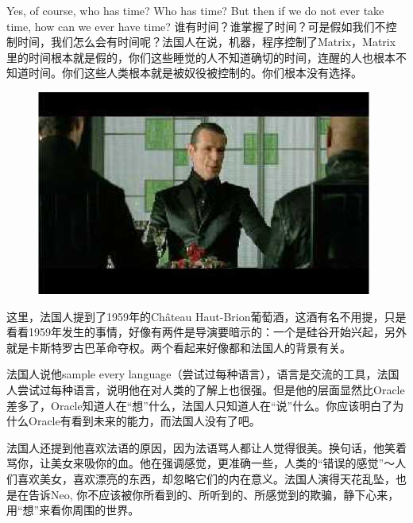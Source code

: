 \documentclass[UTF8]{ctexart}
\begin{document}
Yes, of course, who has time? Who has time? But then if we do not ever take time, how can we ever have time? 谁有时间？谁掌握了时间？可是假如我们不控制时间，我们怎么会有时间呢？法国人在说，机器，程序控制了Matrix，Matrix里的时间根本就是假的，你们这些睡觉的人不知道确切的时间，连醒的人也根本不知道时间。你们这些人类根本就是被奴役被控制的。你们根本没有选择。

\begin{figure}[htb]
\centering
\includegraphics[width=0.5\linewidth]{fig/read_reloaded-93}
\end{figure}

这里，法国人提到了1959年的Château Haut-Brion葡萄酒，这酒有名不用提，只是看看1959年发生的事情，好像有两件是导演要暗示的：一个是硅谷开始兴起，另外就是卡斯特罗古巴革命夺权。两个看起来好像都和法国人的背景有关。

法国人说他sample every language（尝试过每种语言），语言是交流的工具，法国人尝试过每种语言，说明他在对人类的了解上也很强。但是他的层面显然比Oracle差多了，Oracle知道人在“想”什么，法国人只知道人在“说”什么。你应该明白了为什么Oracle有看到未来的能力，而法国人没有了吧。

法国人还提到他喜欢法语的原因，因为法语骂人都让人觉得很美。换句话，他笑着骂你，让美女来吸你的血。他在强调感觉，更准确一些，人类的“错误的感觉”～人们喜欢美女，喜欢漂亮的东西，却忽略它们的内在意义。法国人演得天花乱坠，也是在告诉Neo, 你不应该被你所看到的、所听到的、所感觉到的欺骗，静下心来，用“想”来看你周围的世界。
\end{document}
